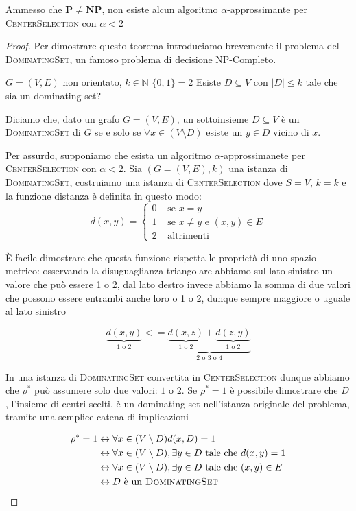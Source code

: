 \begin{theorem}
	Ammesso che $\mathbf{P} \neq \mathbf{NP}$, non esiste alcun algoritmo $\alpha$-approssimante
	per \textsc{CenterSelection} con $\alpha < 2$
\end{theorem}
\begin{proof}
	Per dimostrare questo teorema introduciamo brevemente il problema del \textsc{DominatingSet},
	un famoso problema di decisione NP-Completo.

		{$G=(V, E)$ non orientato, $k \in \mathbb{N}$}
		{$\{0, 1\} = 2$}
		{Esiste $D \subseteq V$ con $|D| \leq k$ tale che sia un dominating set?}

	Diciamo che, dato un grafo $G=(V, E)$, un sottoinsieme $D \subseteq V$ è un \textsc{DominatingSet}
	di $G$ se e solo se $\forall x \in (V \setminus D)$ esiste un $y \in D$ vicino di $x$.

	\bigbreak

	Per assurdo, supponiamo che esista un algoritmo $\alpha$-approssimanete per \textsc{CenterSelection}
	con $\alpha < 2$.
	Sia $(G=(V, E), k)$ una istanza di \textsc{DominatingSet}, costruiamo una istanza di \textsc{CenterSelection}
	dove $S=V$, $k=k$ e la funzione distanza è definita in questo modo:
	$$
	d(x, y) =
	\begin{cases}
	 0 & \text{ se } x = y \\
	 1 & \text{ se } x \neq y \text{ e } (x, y) \in E \\
	 2 & \text{ altrimenti }
	\end{cases}
	$$

	È facile dimostrare che questa funzione rispetta le proprietà di uno spazio metrico: osservando la disuguaglianza
	triangolare abbiamo sul lato sinistro un valore che può essere 1 o 2, dal lato destro invece abbiamo la somma
	di due valori che possono essere entrambi anche loro o 1 o 2, dunque sempre maggiore o uguale al lato sinistro

	$$
		\underbrace{d(x, y)}_{\text{1 o 2}} <= \underbrace{\underbrace{d(x, z)}_{\text{1 o 2}} + \underbrace{d(z, y)}_{\text{1 o 2}}}_{\text{2 o 3 o 4}}
	$$

	In una istanza di \textsc{DominatingSet} convertita in \textsc{CenterSelection} dunque abbiamo che $\rho^*$ può
	assumere solo due valori: $1$ o $2$. Se $\rho^*=1$ è possibile dimostrare che $D$, l'insieme di centri scelti,
	è un dominating set nell'istanza originale del problema, tramite una semplice catena di implicazioni

	\begin{align*}
		\rho^*=1 &\leftrightarrow \forall x \in (V \setminus D) d(x, D) = 1 \\
				 &\leftrightarrow \forall x \in (V \setminus D), \exists y \in D \text{ tale che } d(x, y) = 1 \\
				 &\leftrightarrow \forall x \in (V \setminus D), \exists y \in D \text{ tale che } (x, y) \in E \\
				 &\leftrightarrow D \text{ è un \textsc{DominatingSet}}
	\end{align*}


\end{proof}

